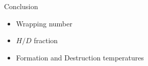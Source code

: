\begin{frame}{Conclusion}
	\begin{itemize}
		\item Wrapping number
		\item $H/D$ fraction
		\item Formation and Destruction temperatures
	\end{itemize}
\end{frame}